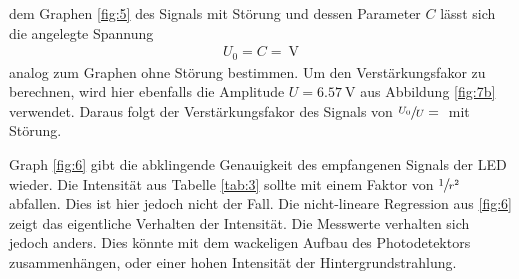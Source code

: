 \justifying dem Graphen \ref{fig:5} des Signals mit Störung und dessen Parameter $C$ lässt sich die angelegte Spannung 
\begin{align}
    U_0 = C = \text{}\SI{}{\volt}
\end{align}
analog zum Graphen ohne Störung bestimmen. Um den Verstärkungsfakor zu berechnen, wird hier ebenfalls die Amplitude $U = \SI{6.57}{\volt}$ aus 
Abbildung \ref{fig:7b} verwendet. Daraus folgt der Verstärkungsfakor des Signals von $\sfrac{U_0}{U} = \text{}$ mit Störung.

\justifying Graph \ref{fig:6} gibt die abklingende Genauigkeit des empfangenen Signals der LED wieder. Die Intensität aus Tabelle
\ref{tab:3} sollte mit einem Faktor von $\sfrac{1}{r^2}$ abfallen. Dies ist hier jedoch nicht der Fall. Die nicht-lineare Regression aus \ref{fig:6} 
zeigt das eigentliche Verhalten der Intensität. Die Messwerte verhalten sich jedoch anders. Dies könnte mit dem wackeligen Aufbau des Photodetektors
zusammenhängen, oder einer hohen Intensität der Hintergrundstrahlung.

\newpage
\printbibliography

